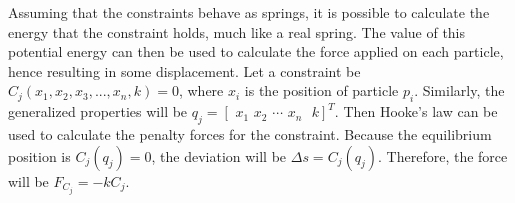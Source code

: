 \documentclass[12pt, letterpaper]{article}
\begin{document}
Assuming that the constraints behave as springs, it is possible to calculate the energy that the constraint holds, much like a real spring. The value of this potential energy can then be used to calculate the force applied on each particle, hence resulting in some displacement. 
Let a constraint be $C_j(x_{1},x_{2},x_{3}, . . . , x_{n}, k) = 0$, where $x_i$ is the position of particle $p_i$. Similarly, the generalized properties will be $q_j = [\hspace{4pt}x_{1} \hspace{4pt} x_{2} \hspace{4pt} \cdots \hspace{4pt} x_{n}\hspace{4pt}\hspace{4pt} k] ^ {T}$. Then Hooke's law can be used to calculate the penalty forces for the constraint. Because the equilibrium position is $C_j(q_j) = 0$, the deviation will be $ \Delta s = C_j(q_j)$. Therefore, the force will be $F_{C_j} = -kC_j$.
\end{document}
